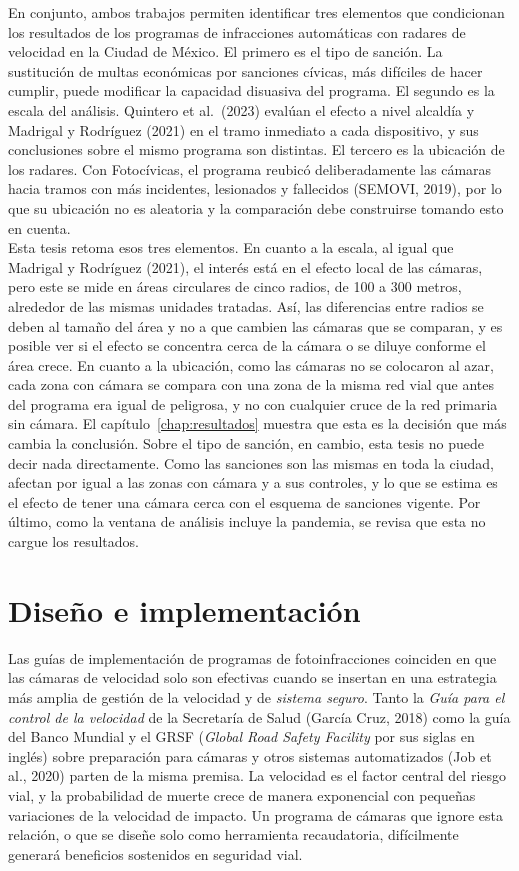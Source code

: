 En conjunto, ambos trabajos permiten identificar tres elementos que condicionan los resultados de los programas de infracciones automáticas con radares de velocidad en la Ciudad de México. El primero es el tipo de sanción. La sustitución de multas económicas por sanciones cívicas, más difíciles de hacer cumplir, puede modificar la capacidad disuasiva del programa. El segundo es la escala del análisis. Quintero et al.\ (2023) evalúan el efecto a nivel alcaldía y Madrigal y Rodríguez (2021) en el tramo inmediato a cada dispositivo, y sus conclusiones sobre el mismo programa son distintas. El tercero es la ubicación de los radares. Con Fotocívicas, el programa reubicó deliberadamente las cámaras hacia tramos con más incidentes, lesionados y fallecidos (SEMOVI, 2019), por lo que su ubicación no es aleatoria y la comparación debe construirse tomando esto en cuenta.\\

Esta tesis retoma esos tres elementos. En cuanto a la escala, al igual que Madrigal y Rodríguez (2021), el interés está en el efecto local de las cámaras, pero este se mide en áreas circulares de cinco radios, de 100 a 300 metros, alrededor de las mismas unidades tratadas. Así, las diferencias entre radios se deben al tamaño del área y no a que cambien las cámaras que se comparan, y es posible ver si el efecto se concentra cerca de la cámara o se diluye conforme el área crece. En cuanto a la ubicación, como las cámaras no se colocaron al azar, cada zona con cámara se compara con una zona de la misma red vial que antes del programa era igual de peligrosa, y no con cualquier cruce de la red primaria sin cámara. El capítulo~\ref{chap:resultados} muestra que esta es la decisión que más cambia la conclusión. Sobre el tipo de sanción, en cambio, esta tesis no puede decir nada directamente. Como las sanciones son las mismas en toda la ciudad, afectan por igual a las zonas con cámara y a sus controles, y lo que se estima es el efecto de tener una cámara cerca con el esquema de sanciones vigente. Por último, como la ventana de análisis incluye la pandemia, se revisa que esta no cargue los resultados.

\section{Diseño e implementación}

\noindent Las guías de implementación de programas de fotoinfracciones coinciden en que las cámaras de velocidad solo son efectivas cuando se insertan en una estrategia más amplia de gestión de la velocidad y de \emph{sistema seguro}. Tanto la \emph{Guía para el control de la velocidad} de la Secretaría de Salud (García Cruz, 2018) como la guía del Banco Mundial y el GRSF (\emph{Global Road Safety Facility} por sus siglas en inglés) sobre preparación para cámaras y otros sistemas automatizados (Job et al., 2020) parten de la misma premisa. La velocidad es el factor central del riesgo vial, y la probabilidad de muerte crece de manera exponencial con pequeñas variaciones de la velocidad de impacto. Un programa de cámaras que ignore esta relación, o que se diseñe solo como herramienta recaudatoria, difícilmente generará beneficios sostenidos en seguridad vial.\\

